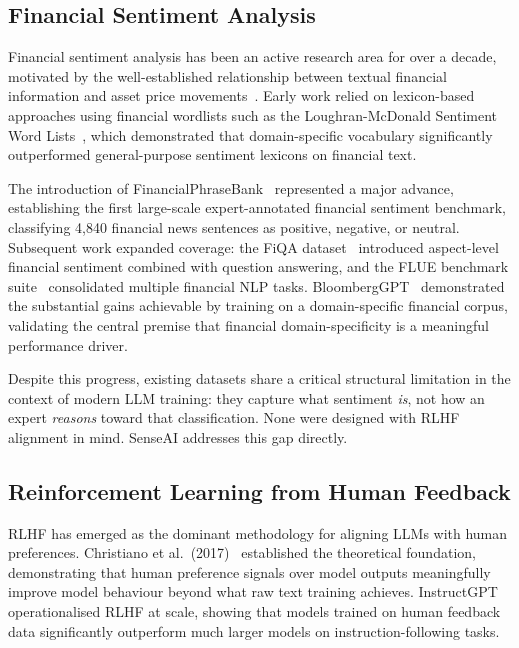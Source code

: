 \documentclass[11pt,a4paper]{article}
\begin{document}
\subsection{Financial Sentiment Analysis}

Financial sentiment analysis has been an active research area for over a decade,
motivated by the well-established relationship between textual financial information
and asset price movements~\cite{tetlock2007giving}. Early work relied on lexicon-based
approaches using financial wordlists such as the Loughran-McDonald Sentiment Word
Lists~\cite{loughran2011liability}, which demonstrated that domain-specific vocabulary
significantly outperformed general-purpose sentiment lexicons on financial text.

The introduction of FinancialPhraseBank~\cite{malo2014good} represented a major
advance, establishing the first large-scale expert-annotated financial sentiment
benchmark, classifying 4,840 financial news sentences as positive, negative, or
neutral. Subsequent work expanded coverage: the FiQA dataset~\cite{maia2018www}
introduced aspect-level financial sentiment combined with question answering, and
the FLUE benchmark suite~\cite{shah2022flue} consolidated multiple financial NLP
tasks. BloombergGPT~\cite{wu2023bloomberggpt} demonstrated the substantial gains
achievable by training on a domain-specific financial corpus, validating the central
premise that financial domain-specificity is a meaningful performance driver.

Despite this progress, existing datasets share a critical structural limitation in the
context of modern LLM training: they capture what sentiment \textit{is}, not how an
expert \textit{reasons} toward that classification. None were designed with RLHF
alignment in mind. SenseAI addresses this gap directly.

\subsection{Reinforcement Learning from Human Feedback}

RLHF has emerged as the dominant methodology for aligning LLMs with human
preferences. Christiano et al.\ (2017)~\cite{christiano2017deep} established the theoretical
foundation, demonstrating that human preference signals over model outputs
meaningfully improve model behaviour beyond what raw text training achieves. InstructGPT~\cite{ouyang2022training}
operationalised RLHF at scale, showing that models trained on human feedback data
significantly outperform much larger models on instruction-following tasks.
\end{document}
